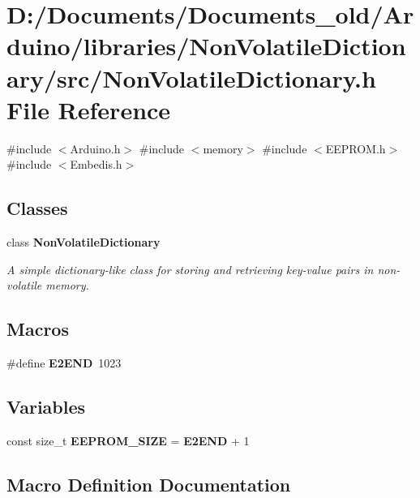 \section{D\+:/\+Documents/\+Documents\+\_\+old/\+Arduino/libraries/\+Non\+Volatile\+Dictionary/src/\+Non\+Volatile\+Dictionary.h File Reference}
\label{_non_volatile_dictionary_8h}
{\ttfamily \#include $<$Arduino.\+h$>$}\newline
{\ttfamily \#include $<$memory$>$}\newline
{\ttfamily \#include $<$E\+E\+P\+R\+O\+M.\+h$>$}\newline
{\ttfamily \#include $<$Embedis.\+h$>$}\newline
\subsection*{Classes}
\begin{DoxyCompactItemize}
\item 
class \textbf{ Non\+Volatile\+Dictionary}
\begin{DoxyCompactList}\small\item\em A simple dictionary-\/like class for storing and retrieving key-\/value pairs in non-\/volatile memory. \end{DoxyCompactList}\end{DoxyCompactItemize}
\subsection*{Macros}
\begin{DoxyCompactItemize}
\item 
\#define \textbf{ E2\+E\+ND}~1023
\end{DoxyCompactItemize}
\subsection*{Variables}
\begin{DoxyCompactItemize}
\item 
const size\+\_\+t \textbf{ E\+E\+P\+R\+O\+M\+\_\+\+S\+I\+ZE} = \textbf{ E2\+E\+ND} + 1
\end{DoxyCompactItemize}


\subsection{Macro Definition Documentation}
\mbox{\label{_non_volatile_dictionary_8h_af3977527a946231b3dd9f1b8cb1084a4}} 

